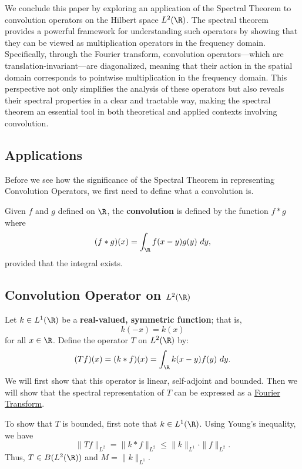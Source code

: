 We conclude this paper by exploring an application of the Spectral Theorem to convolution operators on the Hilbert space \( L^{2}(\R) \). The spectral theorem provides a powerful framework for understanding such operators by showing that they can be viewed as multiplication operators in the frequency domain. Specifically, through the Fourier transform, convolution operators—which are translation-invariant—are diagonalized, meaning that their action in the spatial domain corresponds to pointwise multiplication in the frequency domain. This perspective not only simplifies the analysis of these operators but also reveals their spectral properties in a clear and tractable way, making the spectral theorem an essential tool in both theoretical and applied contexts involving convolution.

\subsection{Applications}

Before we see how the significance of the Spectral Theorem in representing Convolution Operators, we first need to define what a convolution is.

\begin{definition}
    Given \( f \) and \( g  \) defined on \( \R  \), the \textbf{convolution} is defined by the function \( f * g   \) where
    \[  (f * g) (x) = \int_{\R} f(x-y) g(y)   \ dy, \]
    provided that the integral exists.
\end{definition}


\subsection{Convolution Operator on \( L^2(\R) \)}

   Let \( k \in L^{1}(\R) \) be a \textbf{real-valued, symmetric function}; that is,  
   \[  k(-x) = k(x)  \]
   for all \( x \in \R \). Define the operator \( T  \) on \( L^{2}(\R) \) by:
   \[  (Tf)(x) = (k * f)(x) = \int_{ \R } k (x-y) f(y) \ dy. \]
   We will first show that this operator is linear, self-adjoint and bounded. Then we will show that the spectral representation of \( T  \) can be expressed as a {\hyperref[Fourier Transform]{Fourier Transform}}.  

   To show that \( T  \) is bounded, first note that \( k \in L^{1}(\R) \). Using Young's inequality, we have 
   \[  \|T f \|_{L^{2}} = \|k * f\|_{L^{2}} \leq \|k\|_{L^{1}} \cdot \|f\|_{L^{2}}.  \]
   Thus, \( T \in B(L^{2}(\R)) \) and \( M = \|k\|_{L^{1}} \).

